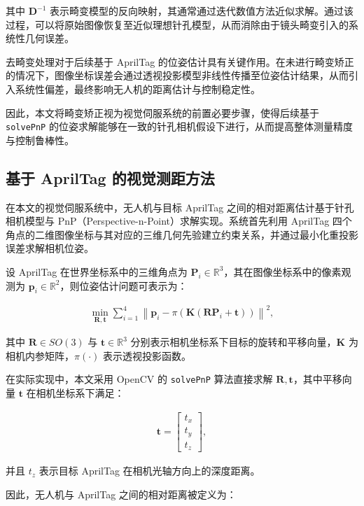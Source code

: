 其中 $\mathbf{D}^{-1}$ 表示畸变模型的反向映射，其通常通过迭代数值方法近似求解。通过该过程，可以将原始图像恢复至近似理想针孔模型，从而消除由于镜头畸变引入的系统性几何误差。

去畸变处理对于后续基于 AprilTag 的位姿估计具有关键作用。在未进行畸变矫正的情况下，图像坐标误差会通过透视投影模型非线性传播至位姿估计结果，从而引入系统性偏差，最终影响无人机的距离估计与控制稳定性。

因此，本文将畸变矫正视为视觉伺服系统的前置必要步骤，使得后续基于 \texttt{solvePnP} 的位姿求解能够在一致的针孔相机假设下进行，从而提高整体测量精度与控制鲁棒性。

\subsection{基于 AprilTag 的视觉测距方法}

在本文的视觉伺服系统中，无人机与目标 AprilTag 之间的相对距离估计基于针孔相机模型与 PnP（Perspective-n-Point）求解实现。系统首先利用 AprilTag 四个角点的二维图像坐标与其对应的三维几何先验建立约束关系，并通过最小化重投影误差求解相机位姿。

设 AprilTag 在世界坐标系中的三维角点为 $\mathbf{P}_i \in \mathbb{R}^3$，其在图像坐标系中的像素观测为 $\mathbf{p}_i \in \mathbb{R}^2$，则位姿估计问题可表示为：

\begin{align}
\min_{\mathbf{R}, \mathbf{t}} \sum_{i=1}^{4} \left\| \mathbf{p}_i - \pi\left( \mathbf{K} \left( \mathbf{R}\mathbf{P}_i + \mathbf{t} \right) \right) \right\|^2,
\end{align}

其中 $\mathbf{R} \in SO(3)$ 与 $\mathbf{t} \in \mathbb{R}^3$ 分别表示相机坐标系下目标的旋转和平移向量，$\mathbf{K}$ 为相机内参矩阵，$\pi(\cdot)$ 表示透视投影函数。

在实际实现中，本文采用 OpenCV 的 \texttt{solvePnP} 算法直接求解 $\mathbf{R}, \mathbf{t}$，其中平移向量 $\mathbf{t}$ 在相机坐标系下满足：

\begin{align}
\mathbf{t} =
\begin{bmatrix}
t_x \\
t_y \\
t_z
\end{bmatrix},
\end{align}

并且 $t_z$ 表示目标 AprilTag 在相机光轴方向上的深度距离。

因此，无人机与 AprilTag 之间的相对距离被定义为：

